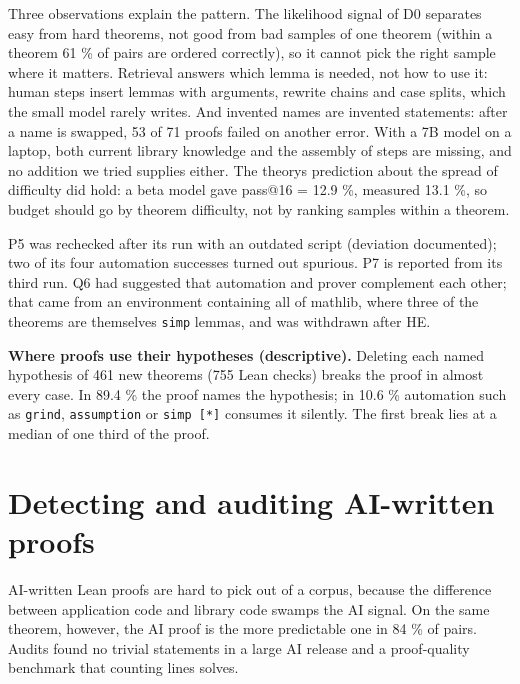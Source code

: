 \documentclass[11pt,a4paper]{article}
\begin{document}
Three observations explain the pattern. The likelihood signal of D0 separates easy from hard theorems, not good from bad samples of one theorem (within a theorem 61 \% of pairs are ordered correctly), so it cannot pick the right sample where it matters. Retrieval answers which lemma is needed, not how to use it: human steps insert lemmas with arguments, rewrite chains and case splits, which the small model rarely writes. And invented names are invented statements: after a name is swapped, 53 of 71 proofs failed on another error. With a 7B model on a laptop, both current library knowledge and the assembly of steps are missing, and no addition we tried supplies either. The theory\textquotesingle s prediction about the spread of difficulty did hold: a beta model gave pass@16 = 12.9 \%, measured 13.1 \%, so budget should go by theorem difficulty, not by ranking samples within a theorem.

P5 was rechecked after its run with an outdated script (deviation documented); two of its four automation successes turned out spurious. P7 is reported from its third run. Q6 had suggested that automation and prover complement each other; that came from an environment containing all of mathlib, where three of the theorems are themselves \texttt{simp} lemmas, and was withdrawn after HE.

\textbf{Where proofs use their hypotheses (descriptive).} Deleting each named hypothesis of 461 new theorems (755 Lean checks) breaks the proof in almost every case. In 89.4 \% the proof names the hypothesis; in 10.6 \% automation such as \texttt{grind}, \texttt{assumption} or \texttt{simp\ {[}*{]}} consumes it silently. The first break lies at a median of one third of the proof.

\section{Detecting and auditing AI-written proofs}

AI-written Lean proofs are hard to pick out of a corpus, because the difference between application code and library code swamps the AI signal. On the same theorem, however, the AI proof is the more predictable one in 84 \% of pairs. Audits found no trivial statements in a large AI release and a proof-quality benchmark that counting lines solves.
\end{document}
